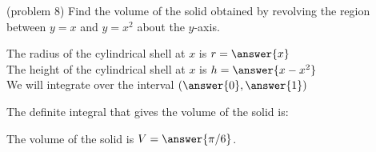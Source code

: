 \documentclass{ximera}
\begin{document}
\begin{problem}(problem 8)
Find the volume of the solid obtained by revolving the region between $y= x$ and $y=x^2$ about the $y$-axis.


The radius of the cylindrical shell at $x$ is $r = \answer{x}$\\
The height of the cylindrical shell at $x$ is $h = \answer{x-x^2}$\\

We will integrate over the interval $\left(\answer{0},\answer{1}\right)$

The definite integral that gives the volume of the solid is:\\
\begin{multipleChoice}
\end{multipleChoice}

The volume of the solid is $V = \answer{\pi/6 }$.

\end{problem}
\end{document}
